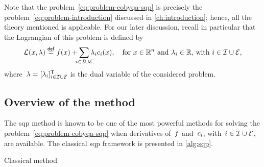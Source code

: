
Note that the problem~\cref{eq:problem-cobyqa-sqp} is precisely the problem~\cref{eq:problem-introduction} discussed in \cref{ch:introduction}; hence, all the theory mentioned is applicable.
For our later discussion, recall in particular that the Lagrangian of this problem is defined by
\begin{equation*}
    \lag(\iter, \lm) \eqdef \obj(\iter) + \sum_{\mathclap{i \in \iub \cup \ieq}} \lm_i \con{i}(\iter), \quad \text{for~$\iter \in \R^n$ and~$\lm_i \in \R$, with~$i \in \iub \cup \ieq$,}
\end{equation*}
where~$\lm = [\lm_i]_{i \in \iub \cup \ieq}^{\T}$ is the dual variable of the considered problem.

\subsection{Overview of the method}

The \gls{sqp} method is known to be one of the most powerful methods for solving the problem~\cref{eq:problem-cobyqa-sqp} when derivatives of~$f$ and~$c_{i}$, with~$i \in \mathcal{I} \cup \mathcal{E}$, are available.
The classical \gls{sqp} framework is presented in \cref{alg:sqp}.

\begin{algorithm}
    \caption{Classical  method}
    \label{alg:sqp}
    \DontPrintSemicolon
\end{algorithm}

